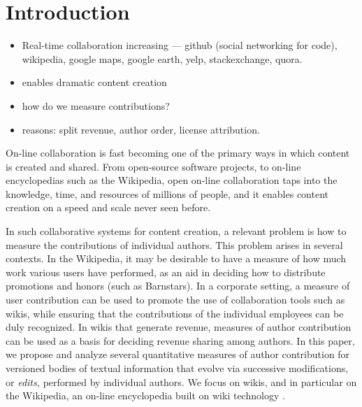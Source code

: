 
\section{Introduction}

\begin{itemize}
\item Real-time collaboration increasing --- github (social networking
    for code), wikipedia, google maps, google earth, yelp,
    stackexchange, quora.
\item enables dramatic content creation
\item how do we measure contributions?
\item reasons: split revenue, author order, license attribution.
\end{itemize}

On-line collaboration is fast becoming one of the primary ways in
which content is created and shared.
From open-source software projects, to on-line encyclopedias such as
the Wikipedia, open on-line collaboration taps into the knowledge,
time, and resources of millions of people, and it enables content
creation on a speed and scale never seen before.

In such collaborative systems for content creation, a relevant 
problem is how to measure the contributions of individual authors. 
This problem arises in several contexts.
In the Wikipedia, it may be desirable to have a measure of how much
work various users have performed, as an aid in deciding how to
distribute promotions and honors (such as Barnstars). 
In a corporate setting, a measure of user contribution can be used to
promote the use of collaboration tools such as wikis, while ensuring
that the contributions of the individual employees can be duly
recognized. 
In wikis that generate revenue, measures of author contribution can be
used as a basis for deciding revenue sharing among authors. 
In this paper, we propose and analyze several quantitative measures of
author contribution for versioned bodies of textual information that
evolve via successive modifications, or {\em edits,} performed by
individual authors. 
We focus on wikis, and in particular on the Wikipedia, an on-line
encyclopedia built on wiki technology \cite{Wikis01}. 


